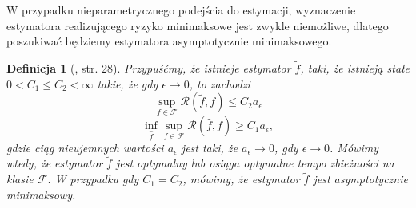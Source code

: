 \documentclass[man,mfiu]{mgrwms}
\newtheorem{df}{Definicja}[chapter]
\begin{document}
W przypadku nieparametrycznego podejścia do estymacji, wyznaczenie estymatora realizującego ryzyko minimaksowe jest zwykle niemożliwe, dlatego poszukiwać będziemy estymatora asymptotycznie minimaksowego. 
\begin{df}[\cite{iphde}, str. 28] Przypuśćmy, że istnieje estymator $\tilde{f}$, taki, że istnieją stałe $0<C_1\leq C_2<\infty$ takie, że gdy $\epsilon\to 0$, to zachodzi 
\begin{displaymath}
\sup_{f\in \mathcal{F}}\mathcal{R}(\tilde{f},f)\leq C_2a_{\epsilon}
\end{displaymath}
\begin{displaymath}
\inf_{\hat{f}}\sup_{f\in \mathcal{F}}\mathcal{R}(\hat{f},f)\geq C_1a_{\epsilon},
\end{displaymath}
gdzie ciąg nieujemnych wartości $a_{\epsilon}$ jest taki, że $a_{\epsilon}\to 0$, gdy $\epsilon\to 0$.
Mówimy wtedy, że estymator $\tilde{f}$ jest optymalny lub osiąga optymalne tempo zbieżności na klasie $\mathcal{F}$. W przypadku gdy $C_1=C_2$, mówimy, że estymator $\tilde{f}$ jest asymptotycznie minimaksowy.
\end{df}
\end{document}
